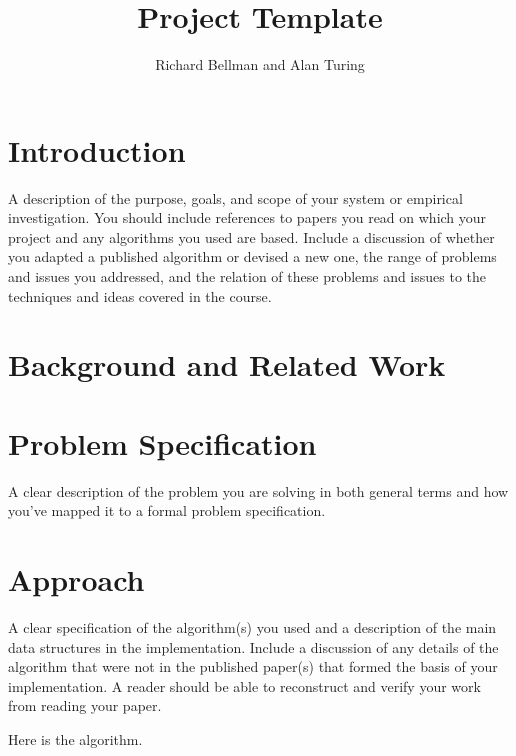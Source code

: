 \documentclass[11pt]{article}
\title{Project Template}
\author{Richard Bellman and Alan Turing}
\begin{document}
\maketitle{}


\section{Introduction}

A description of the purpose, goals, and scope of your system or
empirical investigation.  You should include references to papers you
read on which your project and any algorithms you used are
based. Include a discussion of whether you adapted a published
algorithm or devised a new one, the range of problems and issues you
addressed, and the relation of these problems and issues to the
techniques and ideas covered in the course.

\section{Background and Related Work}



\section{Problem Specification}

A clear description of the problem you are solving in both general terms
and how you've mapped it to a formal problem specification.


\section{Approach}

A clear specification of the algorithm(s) you used and a description
of the main data structures in the implementation. Include a
discussion of any details of the algorithm that were not in the
published paper(s) that formed the basis of your implementation. A
reader should be able to reconstruct and verify your work from reading
your paper.

\begin{algorithm}
  \begin{algorithmic}
    \EndProcedure{}
  \end{algorithmic}
  \caption{Here is the algorithm.}
\end{algorithm}
\end{document}
